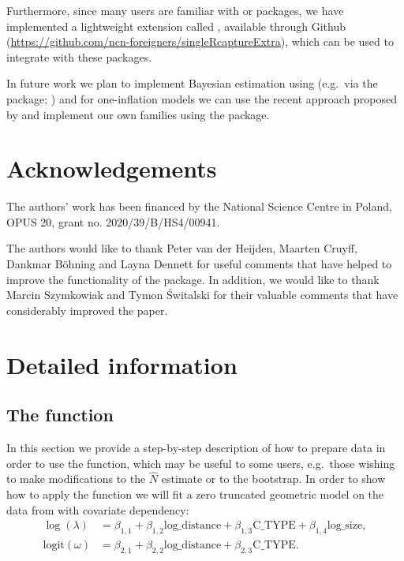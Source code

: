 \documentclass[
]{jss}
\newcommand{\1}{\mathcal{I}} \newcommand{\bZero}{\boldsymbol{0}}
\begin{document}
Furthermore, since many  users are familiar with
 or  packages, we have implemented a lightweight
extension called , available through Github
(\url{https://github.com/ncn-foreigners/singleRcaptureExtra}), which can
be used to integrate  with these packages.

In future work we plan to implement Bayesian estimation using
 (e.g.~via the  package;
\cite{carpenter2017stan, brms}) and for one-inflation models we can use
the recent approach proposed by \cite{tuoto2022bayesian} and implement
our own families using the  package.

\section{Acknowledgements}\label{Acknowledgements}

The authors' work has been financed by the National Science Centre in
Poland, OPUS 20, grant no. 2020/39/B/HS4/00941.

The authors would like to thank Peter van der Heijden, Maarten Cruyff,
Dankmar Böhning and Layna Dennett for useful comments that have helped
to improve the functionality of the package. In addition, we would like
to thank Marcin Szymkowiak and Tymon Świtalski for their valuable
comments that have considerably improved the paper.

\appendix

\section{Detailed information}\label{sec-details}

\subsection[The estimatePopsizeFit function]{The
 function}\label{sec-estimatePopsizeFit}

In this section we provide a step-by-step description of how to prepare
data in order to use the  function, which may
be useful to some users, e.g.~those wishing to make modifications to the
\(\hat{N}\) estimate or to the bootstrap. In order to show how to apply
the function we will fit a zero truncated geometric model on the data
from \citet{chao-generalization} with covariate dependency:
\begin{align*}
  \log(\lambda) &=
  \beta_{1, 1} + \beta_{1, 2} \text{log\_distance} + \beta_{1, 3} \text{C\_TYPE} +
  \beta_{1, 4} \text{log\_size}, \\
  \text{logit}(\omega) &=
  \beta_{2, 1} + \beta_{2, 2} \text{log\_distance} + \beta_{2, 3} \text{C\_TYPE}.
\end{align*}
\end{document}
